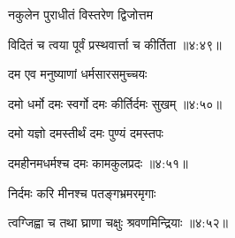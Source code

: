 {\devanagarifont नकुलेन पुराधीतं विस्तरेण द्विजोत्तम \thinspace{\dandab} \dontdisplaylinenum }%


{\devanagarifont विदितं च त्वया पूर्वं प्रस्थवार्त्ता च कीर्तिता {॥४:४९॥} \veg\dontdisplaylinenum }%


{\devanagarifont दम एव मनुष्याणां धर्मसारसमुच्चयः \thinspace{\dandab} \dontdisplaylinenum }%


{\devanagarifont दमो धर्मो दमः स्वर्गो दमः कीर्तिर्दमः सुखम् {॥४:५०॥} \veg\dontdisplaylinenum }%

{\devanagarifont दमो यज्ञो दमस्तीर्थं दमः पुण्यं दमस्तपः \thinspace{\dandab} \dontdisplaylinenum }%


{\devanagarifont दमहीनमधर्मश्च दमः कामकुलप्रदः {॥४:५१॥} \veg\dontdisplaylinenum }%

{\devanagarifont निर्दमः करि मीनश्च पतङ्गभ्रमरमृगाः \thinspace{\dandab} \dontdisplaylinenum }%


{\devanagarifont त्वग्जिह्वा च तथा घ्राणा चक्षुः श्रवणमिन्द्रियाः {॥४:५२॥} \veg\dontdisplaylinenum }%


